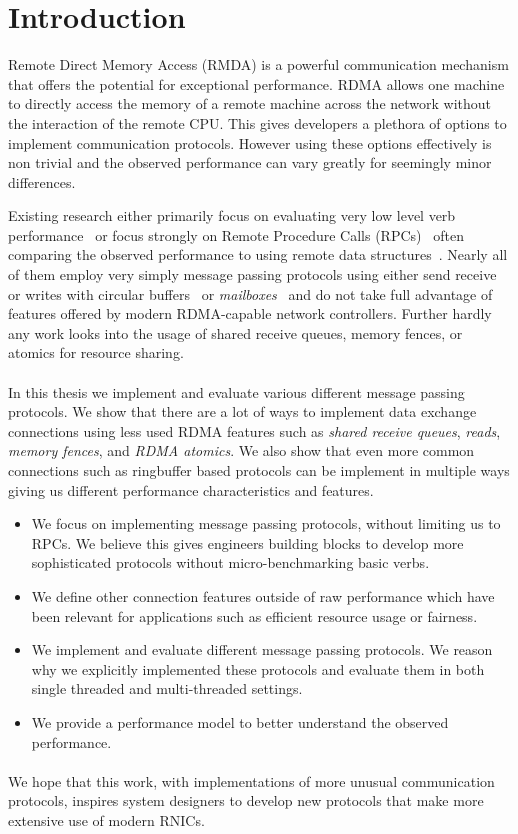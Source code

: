 \section{Introduction}

Remote Direct Memory Access (RMDA) is a powerful communication mechanism that offers the potential for exceptional performance.
RDMA allows one machine to directly access the memory of a remote machine across the network without the interaction of the 
remote CPU. This gives developers a plethora of options to implement communication protocols. However using these options 
effectively is non trivial and the observed performance can vary greatly for seemingly minor differences. 

Existing research either primarily focus on evaluating very low level verb performance~\cite{anuj-guide} or focus strongly on 
Remote Procedure Calls (RPCs)~\cite{eval-mpp} often comparing the observed performance to using remote data 
structures~\cite{fasst, rpc-vs-rdma}. Nearly all of them employ very simply message passing protocols using either 
send receive or writes with circular buffers~\cite{rdma-fast-dbms} or \emph{mailboxes}~\cite{ziegler2020rdma} and do not take full advantage of 
features offered by modern RDMA-capable network controllers. Further hardly any work looks into the usage of shared receive
queues, memory fences, or atomics for resource sharing.

\paragraph{}In this thesis we implement and evaluate various different message passing protocols. We show that there are a 
lot of ways to implement data exchange connections using less used RDMA features such as \emph{shared receive queues}, \emph{reads}, 
\emph{memory fences}, and \emph{RDMA atomics}. We also show that even more common connections such as ringbuffer based protocols 
can be implement in multiple ways giving us different performance characteristics and features.

\begin{itemize}
  \item We focus on implementing message passing protocols, without limiting us to RPCs. We believe this gives engineers 
    building blocks to develop more sophisticated protocols without micro-benchmarking basic verbs.
  \item We define other connection features outside of raw performance which have been relevant for applications such as 
    efficient resource usage or fairness.
  \item We implement and evaluate different message passing protocols. We reason why we explicitly implemented these protocols
    and evaluate them in both single threaded and multi-threaded settings.
  \item We provide a performance model to better understand the observed performance.
\end{itemize}

\paragraph{}We hope that this work, with 
implementations of more unusual communication protocols, inspires system designers to develop 
new protocols that make more extensive use of modern RNICs.


